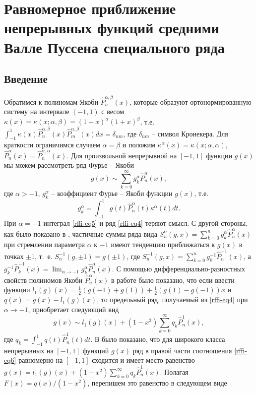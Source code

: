 
\chapter{Равномерное приближение непрерывных функций средними Валле Пуссена специального ряда}
\section{Введение}
Обратимся к полиномам Якоби $\hat P_n^{\alpha,\beta}(x)$, которые образуют ортонормированную систему на интервале $(-1,1)$ с весом $\kappa(x)=\kappa(x;\alpha,\beta)=(1-x)^\alpha(1+x)^\beta$, т.е. $\int_{-1}^1\kappa(x)\hat P_n^{\alpha,\beta}(x)\hat P_m^{\alpha,\beta}(x)dx=\delta_{nm}$, где $\delta_{nm}$ -- символ Кронекера. Для краткости ограничимся случаем $\alpha=\beta$ и положим $\kappa^\alpha(x)=\kappa(x;\alpha,\alpha)$,
$\hat P_n^{\alpha}(x)=\hat P_n^{\alpha,\alpha}(x)$. Для произвольной непрерывной на $[-1,1]$ функции $g(x)$ мы можем рассмотреть ряд Фурье -- Якоби
\begin{equation}\label{rffi-eq4}
g(x)\sim\sum_{k=0}^\infty g_k^\alpha\hat P_n^{\alpha}(x),
\end{equation}
где $\alpha>-1$, $g_k^\alpha$ -- коэффициент Фурье -- Якоби функции $g(x)$, т.е.
\begin{equation}\label{rffi-eq5}
g_k^\alpha=\int_{-1}^1 g(t)\hat P_n^{\alpha}(t)\kappa^\alpha(t)dt.
\end{equation}
При $\alpha=-1$ интеграл \eqref{rffi-eq5} и ряд \eqref{rffi-eq4} теряют смысл. С другой стороны, как было показано в \cite{rffi-13}, частичные суммы  ряда вида $S_n^\alpha(g,x)=\sum_{k=0}^n g_k^\alpha\hat P_n^{\alpha}(x)$ при стремлении параметра $\alpha$ к $-1$ имеют тенденцию приближаться к $g(x)$ в точках $\pm1$, т.~е. $S_n^{-1}(g,\pm1)=g(\pm1)$, где $S_n^{-1}(g,x)=\sum_{k=0}^n g_k^{-1}\hat P_n^{-1}(x)$, а $ g_k^{-1}\hat P_k^{-1}(x)=\lim_{\alpha\to-1}g_k^\alpha\hat P_n^{\alpha}(x)$. С помощью дифференциально-разностных свойств полиномов Якоби $\hat P_n^{\alpha}(x)$ в работе \cite{rffi-13} было показано, что если ввести функции $l_1(g)(x)=\frac12(g(-1)+g(1))+\frac12(g(1)-g(-1))x$ и $q(x)=g(x)-l_1(g)(x)$, то предельный ряд, получаемый из \eqref{rffi-eq4} при $\alpha\to-1$, приобретает  следующий вид
\begin{equation}\label{rffi-eq6}
g(x)\sim l_1(g)(x)+(1-x^2)\sum_{k=0}^\infty q_k\hat P_n^1(x),
\end{equation}
где $q_k=\int_{-1}^1q(t)\hat P_n^1(t)dt$. В \cite{rffi-13} было показано, что для широкого класса непрерывных на $[-1,1]$ функций $g(x)$ ряд в правой части соотношения \eqref{rffi-eq6} равномерно на $[-1,1]$ сходится и имеет место равенство $g(x)= l_1(g)(x)+(1-x^2)\sum_{k=0}^\infty q_k\hat P_n^1(x)$. Полагая $F(x)=q(x)/(1-x^2)$, перепишем это равенство в следующем виде

